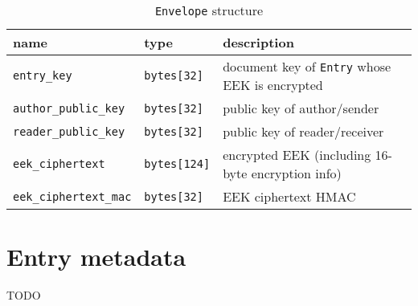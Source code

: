 \documentclass[10pt]{article}
\newcommand{\ttt}[1]{\texttt{#1}}
\def\Entry{\ttt{Entry}}
\def\Envelope{\ttt{Envelope}}
\begin{document}
\begin{appendices}
\begin{table}[htbp]
	\caption*{\Envelope{} structure}
	\begin{small}
	\begin{tabular}{lll}
		\toprule
		name & type  & description \\ \midrule
		\ttt{entry\_key} & \ttt{bytes[32]} & document key of \Entry{} whose EEK is encrypted \\
		\ttt{author\_public\_key} & \ttt{bytes[32]} & public key of author/sender \\
		\ttt{reader\_public\_key} & \ttt{bytes[32]} & public key of reader/receiver \\
		\ttt{eek\_ciphertext}  & \ttt{bytes[124]} & encrypted EEK (including 16-byte encryption info) \\
		\ttt{eek\_ciphertext\_mac} & \ttt{bytes[32]} & EEK ciphertext HMAC \\
		\bottomrule
	\end{tabular}
	\end{small}
\end{table}

\section{Entry metadata}
\label{app:entry-meta}

TODO

\end{appendices}

\printbibliography
\end{document}
